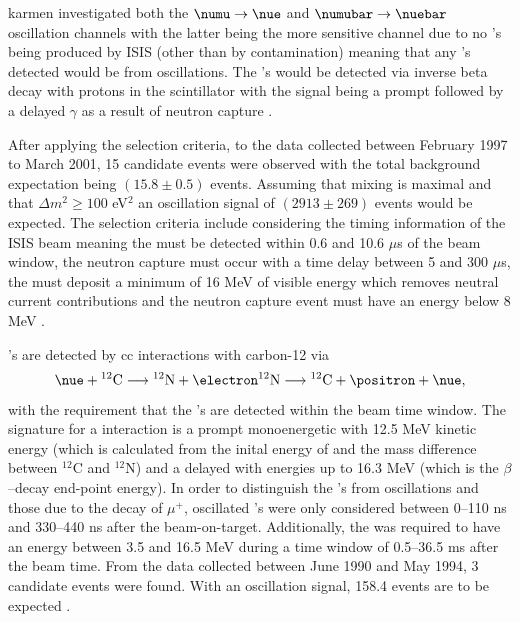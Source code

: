 \gls{karmen} investigated both the $\numu \rightarrow \nue$  and  $\numubar \rightarrow \nuebar$ oscillation channels with the latter being the more sensitive channel due to no \nuebar's being produced by ISIS (other than by contamination) meaning that any \nuebar's detected would be from oscillations. The \nuebar's would be detected via inverse beta decay with protons in the scintillator with the signal being a prompt \positron followed by a delayed $\gamma$ as a result of neutron capture \cite{Upper_limits_for_neutrino_oscillations_numubar_to_nuebar_from_muon_decay_at_rest}. 

After applying the selection criteria, to the data collected between February 1997 to March 2001, 15 \nuebar candidate events were observed with the total background expectation being $(15.8\pm 0.5)$ events. Assuming that mixing is maximal and that $\Delta m^2 \geq 100$ eV$^2$ an oscillation signal of $(2913 \pm 269)$ events would be expected. The selection criteria include considering the timing information of the ISIS beam meaning the \positron must be detected within 0.6 and 10.6 $\mu$s of the beam window, the neutron capture must occur with a time delay between 5 and 300 $\mu$s, the \positron must deposit a minimum of 16 MeV of visible energy which removes neutral current contributions and the neutron capture event must have an energy below 8 MeV \cite{Upper_limits_for_neutrino_oscillations_numubar_to_nuebar_from_muon_decay_at_rest}.

\nue's are detected by \gls{cc} interactions with carbon-12 via
\begin{equation}
    \nue + {^{12}\text{C}} \longrightarrow {^{12}\text{N}} + \electron \\
    {^{12}\text{N}} \longrightarrow {^{12}\text{C}} + \positron + \nue,
\end{equation}
with the requirement that the \nue's are detected within the \numu beam time window. The signature for a \nue interaction is a prompt  monoenergetic \electron with 12.5 MeV kinetic energy (which is calculated from the inital energy of \numu and the mass difference between $^{12}$C and $^{12}$N) and a delayed \positron with energies up to 16.3 MeV (which is the $\beta$--decay end-point energy). In order to distinguish the \nue's from oscillations and those due to the decay of $\mu^+$, oscillated \nue's were only considered between 0--110 ns and 330--440 ns after the beam-on-target. Additionally, the \positron was required to have an energy between 3.5 and 16.5 MeV during a time window of 0.5--36.5 ms after the beam time. From the data collected between June 1990 and May 1994, 3 candidate events were found. With an oscillation signal, 158.4 events are to be expected \cite{Limits_on_neutrino_oscillations_in_the_appearance_channels_numu_to_nue_and_numubar_to_nuebar}. 

